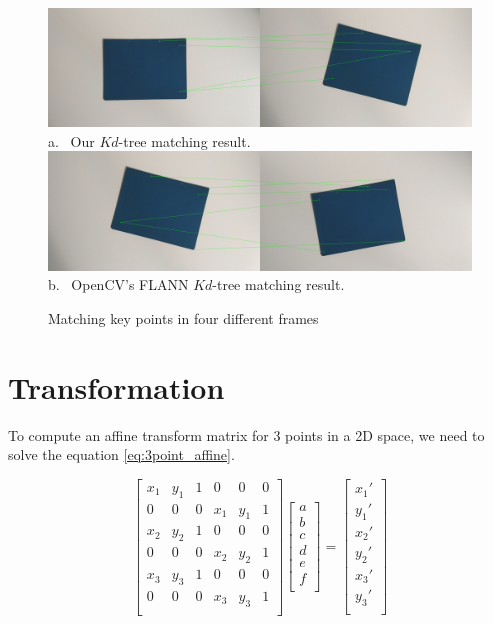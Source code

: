 \documentclass[]{IEEEtran}
\begin{document}
\begin{figure}[tb]
  \centering
  \includegraphics[width=0.8\linewidth]{./figures/feature_matching/feature_matching_1.jpg} \\
  a.~ Our $Kd$-tree matching result.\\
  \includegraphics[width=0.8\linewidth]{./figures/feature_matching/feature_matching_2.jpg}\\
  b.~ OpenCV's FLANN $Kd$-tree matching result.
  \caption{Matching key points in four different frames}
  \label{fig:matches}
\end{figure}

\section{Transformation}
To compute an affine transform matrix for 3 points in a 2D space, we need to solve the equation \ref{eq:3point_affine}.

\begin{equation} \label{eq:3point_affine}
\begin{bmatrix}
    x_1 & y_1 & 1 & 0 & 0 & 0 \\
    0 & 0 & 0 & x_1 & y_1 & 1 \\
    x_2 & y_2 & 1 & 0 & 0 & 0 \\
    0 & 0 & 0 & x_2 & y_2 & 1 \\
    x_3 & y_3 & 1 & 0 & 0 & 0 \\
    0 & 0 & 0 & x_3 & y_3 & 1 \\
\end{bmatrix}
\begin{bmatrix}
   a \\
   b \\
   c \\
   d \\
   e \\
   f \\
\end{bmatrix}
=
\begin{bmatrix}
   x_1' \\
   y_1' \\
   x_2' \\
   y_2' \\
   x_3' \\
   y_3' \\
\end{bmatrix}
\end{equation}
\end{document}
